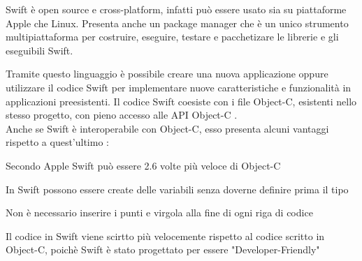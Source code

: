 Swift \`e open source e cross-platform, infatti pu\`o essere usato sia su piattaforme Apple che Linux. Presenta anche un package manager che \`e un
unico strumento multipiattaforma per costruire, eseguire, testare e pacchetizare le librerie e gli eseguibili Swift.

Tramite questo linguaggio \`e possibile creare una nuova applicazione oppure utilizzare il codice Swift per implementare nuove caratteristiche e funzionalit\`a in applicazioni preesistenti.
Il codice Swift coesiste con i file Object-C, esistenti nello stesso progetto, con pieno accesso alle API Object-C \cite{Apple:Com}.\\
Anche se Swift \`e interoperabile con Object-C, esso presenta alcuni vantaggi rispetto a quest'ultimo \cite{Swift:ObjectC}:
\begin{list}{*}{}
      \item Secondo Apple Swift pu\`o essere 2.6 volte pi\`u veloce di Object-C
      \item In Swift possono essere create delle variabili senza doverne definire prima il tipo
      \item Non \`e necessario inserire i punti e virgola alla fine di ogni riga di codice
      \item Il codice in Swift viene scirtto pi\`u velocemente rispetto al codice scritto in Object-C, poich\`e Swift \`e stato
            progettato per essere "Developer-Friendly"
\end{list}

